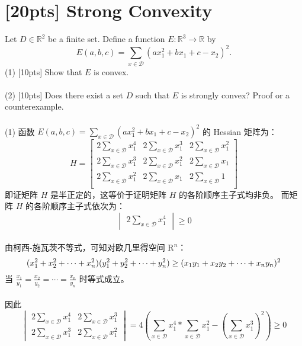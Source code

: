 \documentclass{article}
\begin{document}
	\section{[20pts] Strong Convexity}
	Let $D\in \mathbb{R}^2$ be a finite set. Define a function $E: \mathbb{R}^3 \rightarrow \mathbb{R}$ by\\
	\begin{equation}
	E(a,b,c)=\sum\limits_{x\in\mathcal{D}}(ax^2_1+bx_1+c-x_2)^2.
	\end{equation}
	(1) [10pts] Show that $E$ is convex.\\ \\
	(2) [10pts] Does there exist a set $D$ such that $E$ is strongly convex? Proof or a counterexample. \\ \\
	(1) 函数 $E(a,b,c)=\sum\limits_{x\in\mathcal{D}}(ax^2_1+bx_1+c-x_2)^2$ 的 Hessian 矩阵为：
		\begin{equation}
		H = \begin{bmatrix}
			2\sum\limits_{x\in\mathcal{D}}x_1^4 & 2\sum\limits_{x\in\mathcal{D}}x_1^3  & 2\sum\limits_{x\in\mathcal{D}}x_1^2 \\ 
			2\sum\limits_{x\in\mathcal{D}}x_1^3 & 2\sum\limits_{x\in\mathcal{D}}x_1^2  & 2\sum\limits_{x\in\mathcal{D}}x_1 \\ 
			2\sum\limits_{x\in\mathcal{D}}x_1^2 & 2\sum\limits_{x\in\mathcal{D}}x_1  & 2\sum\limits_{x\in\mathcal{D}}1 \\ 
			\end{bmatrix}
		\end{equation}
		即证矩阵 $H$ 是半正定的，这等价于证明矩阵 $H$ 的各阶顺序主子式均非负。
		而矩阵 $H$ 的各阶顺序主子式依次为：
		\begin{equation}
		\begin{vmatrix}
		2\sum\limits_{x\in\mathcal{D}}x_1^4
		\end{vmatrix} \geq 0
		\end{equation} \\
		由柯西-施瓦茨不等式，可知对欧几里得空间 $\mathrm{R}^n$：\\
		\begin{equation}
		(x_1^2 +x_2^2 + \cdots + x_n^2)(y_1^2 +y_2^2 + \cdots + y_n^2) \ge (x_1 y_1 + x_2 y_2 + \cdots + x_n y_n)^2 \\
		\end{equation}
		当 $\frac{x_1}{y_1} = \frac{x_2}{y_2} = \cdots = \frac{x_n}{y_n}$ 时等式成立。\\ \\
		因此
		\begin{equation}
			\begin{vmatrix}
			2\sum\limits_{x\in\mathcal{D}}x_1^4 & 2\sum\limits_{x\in\mathcal{D}}x_1^3 \\ 
			2\sum\limits_{x\in\mathcal{D}}x_1^3 & 2\sum\limits_{x\in\mathcal{D}}x_1^2
			\end{vmatrix} = 4(\sum\limits_{x\in\mathcal{D}}x_1^4 * \sum\limits_{x\in\mathcal{D}}x_1^2 - (\sum\limits_{x\in\mathcal{D}}x_1^3)^2) \geq 0
			\end{equation} \\
\end{document}
